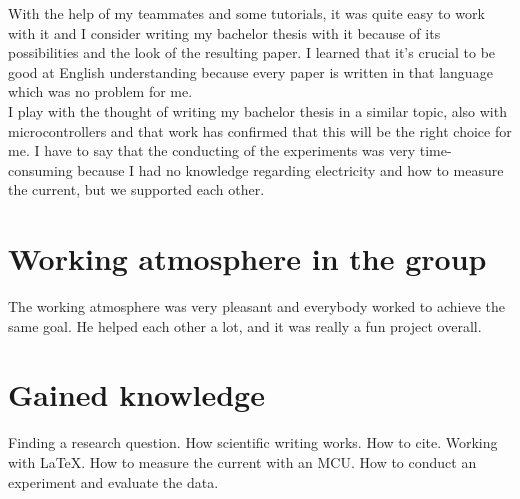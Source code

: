 With the help of my teammates and some tutorials, it was quite easy to work with it and I consider writing my bachelor thesis with it because of its possibilities and the look of the resulting paper. 
I learned that it's crucial to be good at English understanding because every paper is written in that language which was no problem for me.\\ 
I play with the thought of writing my bachelor thesis in a similar topic, also with microcontrollers and that work has confirmed that this will be the right choice for me. 
I have to say that the conducting of the experiments was very time-consuming because I had no knowledge regarding electricity and how to measure the current, but we supported each other.

\section*{Working atmosphere in the group}
The working atmosphere was very pleasant and everybody worked to achieve the same goal. He helped each other a lot, and it was really a fun project overall.

\section*{Gained knowledge}
Finding a research question. How scientific writing works. How to cite. Working with LaTeX. How to measure the current with an MCU. How to conduct an experiment and evaluate the data.